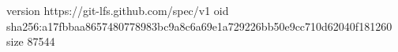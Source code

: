 version https://git-lfs.github.com/spec/v1
oid sha256:a17fbbaa8657480778983bc9a8c6a69e1a729226bb50e9cc710d62040f181260
size 87544
